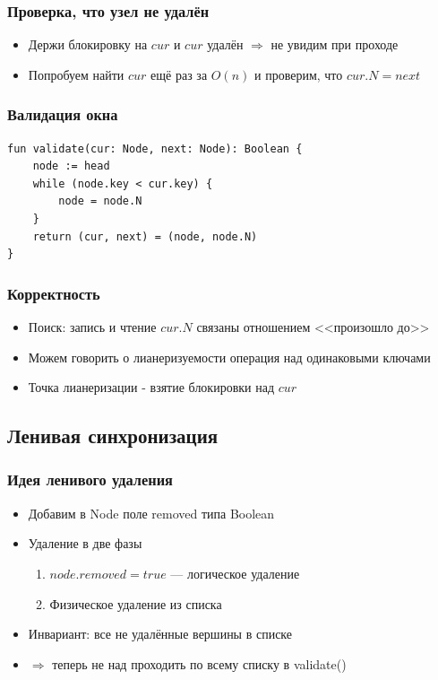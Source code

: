 \documentclass[10pt,a4paper,oneside,titlepage]{article}
\theoremstyle{plain}
\theoremstyle{defenition}
\begin{document}
\subsubsection{Проверка, что узел не удалён}

\begin{itemize}
	\item Держи блокировку на $cur$ и $cur$ удалён $\Rightarrow$ не увидим при проходе
	\item Попробуем найти $cur$ ещё раз за $O(n)$ и проверим, что $cur.N=next$
\end{itemize}

\subsubsection{Валидация окна}

\begin{lstlisting}
fun validate(cur: Node, next: Node): Boolean {
    node := head
    while (node.key < cur.key) {
        node = node.N
    }    
    return (cur, next) = (node, node.N)
}
\end{lstlisting}

\subsubsection{Корректность}

\begin{itemize}
	\item Поиск: запись и чтение $cur.N$ связаны отношением <<произошло до>>
	\item Можем говорить о лианеризуемости операция над одинаковыми ключами
	\item Точка лианеризации - взятие блокировки над $cur$
\end{itemize}

\subsection{Ленивая синхронизация}

\subsubsection{Идея ленивого удаления}

\begin{itemize}
	\item Добавим в Node поле removed типа Boolean
	\item Удаление в две фазы
	      \begin{enumerate}
	      	\item $node.removed=true$ --- логическое удаление
	      	\item Физическое удаление из списка
	      \end{enumerate}
    \item Инвариант: все не удалённые вершины в списке
    \item $\Rightarrow$ теперь не над проходить по всему списку в validate()
\end{itemize}
\end{document}
